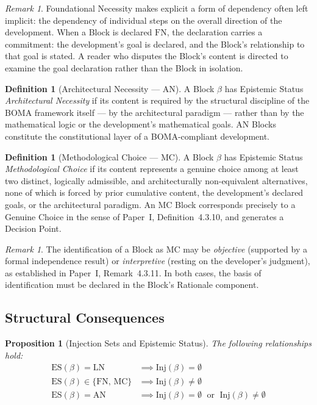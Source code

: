 \documentclass[12pt, a4paper]{article}
\theoremstyle{plain}
\newtheorem{proposition}[theorem]{Proposition}
\theoremstyle{definition}
\newtheorem{definition}[theorem]{Definition}
\theoremstyle{remark}
\newtheorem{remark}[theorem]{Remark}
\newcommand{\BOMA}{\textsf{BOMA}}
\newcommand{\Inj}[1]{\mathrm{Inj}(#1)}
\newcommand{\ES}[1]{\mathrm{ES}(#1)}
\newcommand{\LN}{\mathrm{LN}}
\newcommand{\FN}{\mathrm{FN}}
\newcommand{\AN}{\mathrm{AN}}
\newcommand{\MC}{\mathrm{MC}}
\begin{document}
\begin{remark}
Foundational Necessity makes explicit a form of dependency often left
implicit: the dependency of individual steps on the overall direction
of the development. When a Block is declared $\FN$, the declaration
carries a commitment: the development's goal is declared, and the
Block's relationship to that goal is stated. A reader who disputes
the Block's content is directed to examine the goal declaration rather
than the Block in isolation.
\end{remark}

\begin{definition}[Architectural Necessity --- $\AN$]
\label{def:an}
A Block $\beta$ has Epistemic Status \emph{Architectural Necessity} if
its content is required by the structural discipline of the \BOMA{}
framework itself --- by the architectural paradigm --- rather than by
the mathematical logic or the development's mathematical goals.
$\AN$ Blocks constitute the constitutional layer of a
\BOMA{}-compliant development.
\end{definition}

\begin{definition}[Methodological Choice --- $\MC$]
\label{def:mc}
A Block $\beta$ has Epistemic Status \emph{Methodological Choice} if
its content represents a genuine choice among at least two distinct,
logically admissible, and architecturally non-equivalent alternatives,
none of which is forced by prior cumulative content, the development's
declared goals, or the architectural paradigm. An $\MC$ Block
corresponds precisely to a Genuine Choice in the sense of
Paper~I, Definition~4.3.10, and generates a Decision Point.
\end{definition}

\begin{remark}
The identification of a Block as $\MC$ may be \emph{objective}
(supported by a formal independence result) or \emph{interpretive}
(resting on the developer's judgment), as established in Paper~I,
Remark~4.3.11. In both cases, the basis of identification must be
declared in the Block's Rationale component.
\end{remark}

\subsection{Structural Consequences}
\label{subsec:ep-structure}

\begin{proposition}[Injection Sets and Epistemic Status]
\label{prop:es-inj}
The following relationships hold:
\begin{align*}
  \ES{\beta} = \LN &\implies \Inj{\beta} = \emptyset \\
  \ES{\beta} \in \{\FN,\,\MC\} &\implies \Inj{\beta} \neq \emptyset \\
  \ES{\beta} = \AN &\implies \Inj{\beta} = \emptyset
                      \;\text{ or }\; \Inj{\beta} \neq \emptyset
\end{align*}
\end{proposition}
\end{document}
